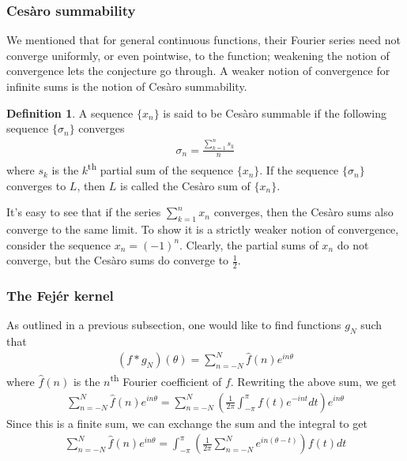 \documentclass[12pt, titlepage]{article}
\theoremstyle{definition}
\newtheorem{defn}{Definition}[section]
\begin{document}
\subsubsection{Cesàro summability}
We mentioned that for general continuous functions, their Fourier series need not converge uniformly, or even pointwise, to the function; weakening the notion of convergence lets the conjecture go through. A weaker notion of convergence for infinite sums is the notion of Cesàro summability.
\begin{defn}
    A sequence $\{x_n\}$ is said to be Cesàro summable if the following sequence $\{\sigma_n\}$ converges
    \begin{align*}
        \sigma_n = \frac{\sum_{k=1}^{n} s_k }{n}
    \end{align*}
    where $s_k$ is the $k$\textsuperscript{th} partial sum of the sequence $\{x_n\}$. If the sequence $\{ \sigma_n \}$ converges to $L$, then $L$ is called the Cesàro sum of $\{x_n\}$.
\end{defn}

It's easy to see that if the series $\displaystyle \sum_{k=1}^{n} x_n$ converges, then the Cesàro sums also converge to the same limit. To show it is a strictly weaker notion of convergence, consider the sequence $x_n = (-1)^n$. Clearly, the partial sums of $x_n$ do not converge, but the Cesàro sums do converge to $\frac{1}{2}$.

\subsubsection{The Fejér kernel}
As outlined in a previous subsection, one would like to find functions $g_N$ such that
\begin{align*}
    (f \ast g_N)(\theta) = \sum_{n = -N}^{N} \widehat{f}(n) e^{in\theta}
\end{align*}
where $\widehat{f}(n)$ is the $n$\textsuperscript{th} Fourier coefficient of $f$. Rewriting the above sum, we get
\begin{align*}
    \sum_{n = -N}^{N} \widehat{f}(n) e^{in\theta} = \sum_{n = -N}^{N} \left( \frac{1}{2\pi} \int_{-\pi}^{\pi} f(t) e^{-int} dt \right) e^{in\theta}
\end{align*}
Since this is a finite sum, we can exchange the sum and the integral to get
\begin{align*}
    \sum_{n = -N}^{N} \widehat{f}(n) e^{in\theta} = \int_{-\pi}^{\pi} \left( \frac{1}{2\pi} \sum_{n = -N}^{N} e^{in(\theta - t)} \right) f(t) dt
\end{align*}
\end{document}
